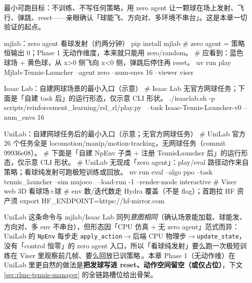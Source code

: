 最小可跑目标：不训练、不写任何策略，用 zero agent 让一颗球在场上发射、飞行、弹跳、reset——亲眼确认「球能飞、方向对、多环境不串台」。这是本章一切验证的起点。

\begin{codebox}[bash]{mjlab：zero agent 看球发射（约两分钟）}
pip install mjlab
# zero agent = 策略恒输出 0；Phase 1 无动作维度，本来就只能用 zero/random。
# 应看到：蓝色球场 + 黄色球，从 x>0 侧飞向 x<0 侧，弹跳后停住再 reset。
uv run play Mjlab-Tennis-Launcher --agent zero --num-envs 16 --viewer viser
\end{codebox}

\begin{codebox}[bash]{Isaac Lab：自建网球场景的最小入口（示意）}
# Isaac Lab 无官方网球任务；下面是「自建 task 后」的运行形态，仅示意 CLI 形状。
./isaaclab.sh -p scripts/reinforcement_learning/rsl_rl/play.py \
  --task Isaac-Tennis-Launcher-v0 --num_envs 16
\end{codebox}

\begin{codebox}[bash]{UniLab：自建网球任务后的最小入口（示意；无官方网球任务）}
# UniLab 官方 26 个任务全是 locomotion/manip/motion-tracking，无网球任务（commit 99936e08）。
# 下面是「自建 NpEnv 子类 + 注册 TennisLauncher 后」的运行形态，仅示意 CLI 形状。
# UniLab 无现成「zero agent」：play/eval 路径动作来自策略；看球纯发射可跑极短训练或回放。
uv run eval --algo ppo --task tennis_launcher --sim mujoco \
    --load-run -1 --render-mode interactive   # Viser web 3D 看球场+球
# env 数/迭代数走 Hydra 覆盖（不是 flag）；首跑拉 HF 资产须 export HF_ENDPOINT=https://hf-mirror.com
\end{codebox}

UniLab 这条命令与 mjlab/Isaac Lab 同列\emph{意图相同}（确认场景能加载、球能发、方向对、多 env 不串台），但形态因「CPU 仿真 $+$ 无 zero agent」范式而异：UniLab 的 \verb|NpEnv| 每步走 \verb|apply_action|$\to$后端 CPU 物理步$\to$\verb|update_state|，没有「control 恒零」的 zero agent 入口，所以「看球纯发射」要么跑一次极短训练在 Viser 里观察前几帧、要么回放已训策略\,\cite{unilab2026}。本章 Phase 1（无动作维）在 UniLab 里更自然的做法是\textbf{把发球写进 reset、动作空间留空（或仅占位）}，下文 \cref{sec:rlmc-tennis-manager} 的全链路槽位给出骨架。

